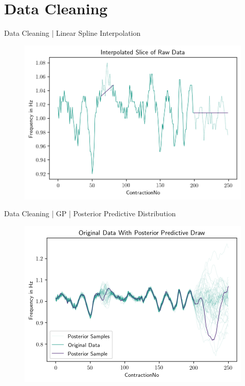 \documentclass{beamer}
\begin{document}
    \section{Data Cleaning}
    \begin{frame}{Data Cleaning | Linear Spline Interpolation}
        \begin{figure}[hbt]
        	\center
        	\includegraphics[width=1.0\textwidth]{img/slice_raw_data_linear_spline_interpolation.png}
        	\label{fig:interpolation_and_padding}
        \end{figure}
    \end{frame}
    
    \begin{frame}{Data Cleaning | GP | Posterior Predictive Distribution}
        \begin{figure}[hbt]
        	\center
        	\includegraphics[width=1.0\textwidth]{img/gp_data_example_posterior_predictive.png}
        	\label{fig:posterior_predictive_kernel}
        \end{figure}
    \end{frame}
    
\end{document}
